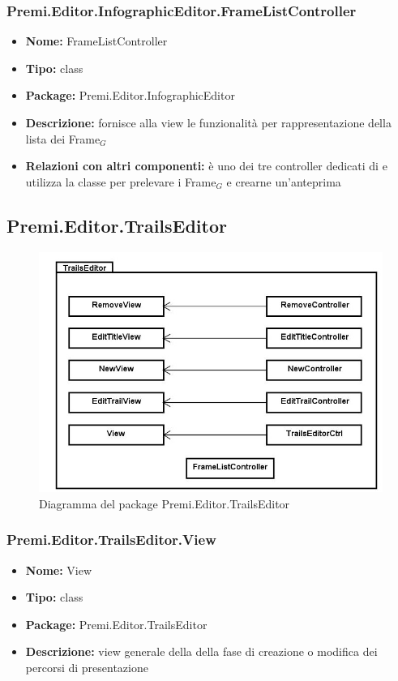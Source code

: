 \subsubsection{Premi.Editor.InfographicEditor.FrameListController}
\begin{itemize}
  \item \textbf{Nome:} FrameListController
  \item \textbf{Tipo:} class
  \item \textbf{Package:} Premi.Editor.InfographicEditor
  \item \textbf{Descrizione:} fornisce alla view  le funzionalità per rappresentazione della lista dei Frame$_G$
  \item \textbf{Relazioni con altri componenti:} è uno dei tre controller dedicati di    e utilizza la classe  per prelevare i Frame$_G$ e crearne un'anteprima
\end{itemize}



\clearpage
\subsection{Premi.Editor.TrailsEditor}
\begin{figure}[h!]
\begin{center}
\includegraphics[scale=0.45]{img/diapkg/vecchi/trailseditor-class.jpg}
\caption{Diagramma del package Premi.Editor.TrailsEditor}
\end{center}
\end{figure}
\subsubsection{Premi.Editor.TrailsEditor.View}
\begin{itemize}
  \item \textbf{Nome:} View
  \item \textbf{Tipo:} class
  \item \textbf{Package:} Premi.Editor.TrailsEditor
  \item \textbf{Descrizione:} view generale della della fase di creazione o modifica dei percorsi di presentazione
\end{itemize}
